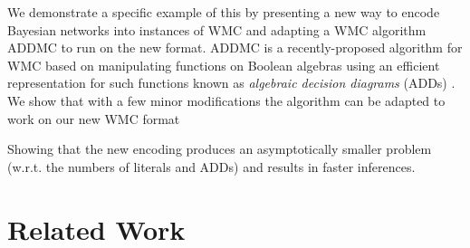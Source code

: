 \documentclass[letterpaper]{article} %
\theoremstyle{definition}
\theoremstyle{remark}
\begin{document}
We demonstrate a specific example of this by presenting a new way to
encode Bayesian networks into instances of WMC and adapting a WMC algorithm
ADDMC to run on the new format. ADDMC \cite{DBLP:conf/aaai/DudekPV20} is a
recently-proposed algorithm for WMC based on manipulating functions on Boolean
algebras using an efficient representation for such functions known as
\emph{algebraic decision diagrams} (ADDs)
\cite{DBLP:journals/fmsd/BaharFGHMPS97}. We show that with a few minor
modifications the algorithm can be adapted to work on our new WMC format 

Showing that the new encoding produces an asymptotically smaller problem (w.r.t.
the numbers of literals and ADDs) and results in faster inferences.


\section{Related Work}
\end{document}
